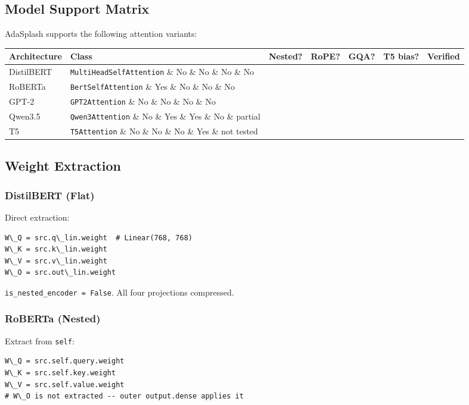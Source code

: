 \subsection{Model Support Matrix}

AdaSplash supports the following attention variants:

\begin{table}[H]
\centering
\small
\begin{tabular}{lllllll}
\toprule
\textbf{Architecture} & \textbf{Class} & \textbf{Nested?} & \textbf{RoPE?} & \textbf{GQA?} & \textbf{T5 bias?} & \textbf{Verified} \\
\midrule
DistilBERT & \texttt{MultiHeadSelfAttention} \& No \& No \& No \& No &  \\
RoBERTa & \texttt{BertSelfAttention} \& Yes \& No \& No \& No &  \\
GPT-2 & \texttt{GPT2Attention} \& No \& No \& No \& No &  \\
Qwen3.5 & \texttt{Qwen3Attention} \& No \& Yes \& Yes \& No \& partial \\
T5 & \texttt{T5Attention} \& No \& No \& No \& Yes \& not tested \\
\bottomrule
\end{tabular}
\end{table}

\subsection{Weight Extraction}

\subsubsection{DistilBERT (Flat)}

Direct extraction:

\begin{lstlisting}
W\_Q = src.q\_lin.weight  # Linear(768, 768)
W\_K = src.k\_lin.weight
W\_V = src.v\_lin.weight
W\_O = src.out\_lin.weight
\end{lstlisting}

\texttt{is\_nested\_encoder = False}. All four projections compressed.

\subsubsection{RoBERTa (Nested)}

Extract from \texttt{self}:

\begin{lstlisting}
W\_Q = src.self.query.weight
W\_K = src.self.key.weight
W\_V = src.self.value.weight
# W\_O is not extracted -- outer output.dense applies it
\end{lstlisting}

